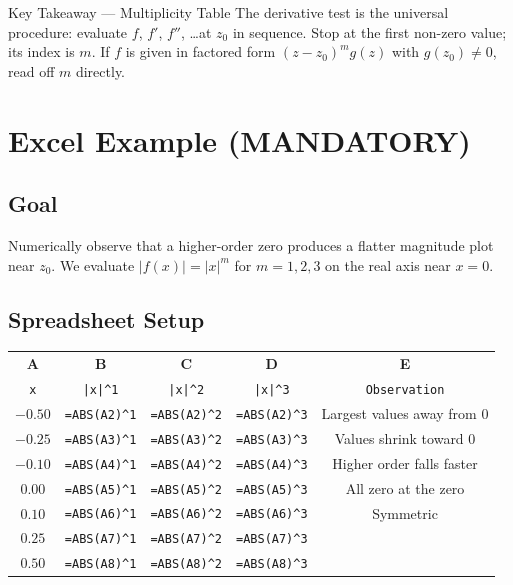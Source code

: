 \documentclass[12pt,a4paper]{article}
\begin{document}
\begin{learnbox}{Key Takeaway --- Multiplicity Table}
The derivative test is the universal procedure: evaluate $f$, $f'$, $f''$, \ldots at
$z_0$ in sequence. Stop at the first non-zero value; its index is $m$. If $f$ is given
in factored form $(z-z_0)^m g(z)$ with $g(z_0)\neq 0$, read off $m$ directly.
\end{learnbox}

\section{Excel Example (MANDATORY)}

\subsection*{Goal}

Numerically observe that a higher-order zero produces a flatter magnitude plot near $z_0$.
We evaluate $|f(x)| = |x|^m$ for $m = 1, 2, 3$ on the real axis near $x = 0$.

\subsection*{Spreadsheet Setup}

\begin{center}
\begin{tabular}{ccccc}
\toprule
\textbf{A} & \textbf{B} & \textbf{C} & \textbf{D} & \textbf{E}\\
\texttt{x} & \texttt{|x|\^{}1} & \texttt{|x|\^{}2} & \texttt{|x|\^{}3} & \texttt{Observation}\\
\midrule
$-0.50$ & \texttt{=ABS(A2)\^{}1} & \texttt{=ABS(A2)\^{}2} & \texttt{=ABS(A2)\^{}3} & Largest values away from 0\\
$-0.25$ & \texttt{=ABS(A3)\^{}1} & \texttt{=ABS(A3)\^{}2} & \texttt{=ABS(A3)\^{}3} & Values shrink toward 0\\
$-0.10$ & \texttt{=ABS(A4)\^{}1} & \texttt{=ABS(A4)\^{}2} & \texttt{=ABS(A4)\^{}3} & Higher order falls faster\\
$0.00$  & \texttt{=ABS(A5)\^{}1} & \texttt{=ABS(A5)\^{}2} & \texttt{=ABS(A5)\^{}3} & All zero at the zero\\
$0.10$  & \texttt{=ABS(A6)\^{}1} & \texttt{=ABS(A6)\^{}2} & \texttt{=ABS(A6)\^{}3} & Symmetric\\
$0.25$  & \texttt{=ABS(A7)\^{}1} & \texttt{=ABS(A7)\^{}2} & \texttt{=ABS(A7)\^{}3} & \\
$0.50$  & \texttt{=ABS(A8)\^{}1} & \texttt{=ABS(A8)\^{}2} & \texttt{=ABS(A8)\^{}3} & \\
\bottomrule
\end{tabular}
\end{center}
\end{document}
